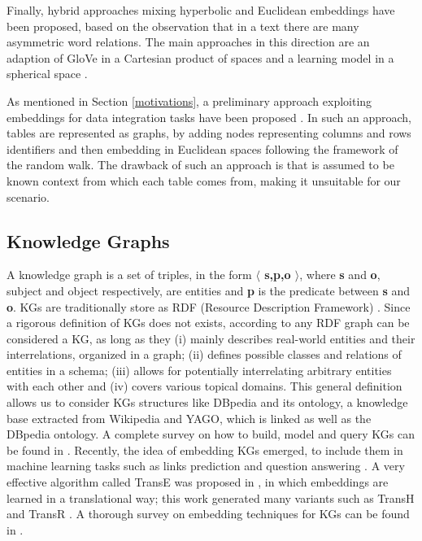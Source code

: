 Finally, hybrid approaches mixing hyperbolic and Euclidean embeddings have been proposed, based on the observation that in a text there are many asymmetric word relations. The main approaches in this direction are an adaption of GloVe in a Cartesian product of spaces \cite{tifrea2018poincare} and a learning model in a spherical space \cite{meng2019spherical}.  

As mentioned in Section \ref{motivations}, a preliminary approach exploiting embeddings for data integration tasks have been proposed \cite{cappuzzo2020creating}. In such an approach, tables are represented as graphs, by adding nodes representing columns and rows identifiers and then embedding in Euclidean spaces following the framework of the random walk. The drawback of such an approach is that is assumed to be known context from which each table comes from, making it unsuitable for our scenario.

\subsection{Knowledge Graphs}
A knowledge graph is a set of triples, in the form \textbf{$\langle$ s,p,o $\rangle$}, where \textbf{s} and \textbf{o}, subject and object respectively, are entities and \textbf{p} is the predicate between \textbf{s} and \textbf{o}. KGs are traditionally store as RDF (Resource Description Framework) \cite{colazzo2014rdf}. Since a rigorous definition of KGs does not exists, according to \cite{paulheim2017knowledge} any RDF graph can be considered a KG, as long as they (i) mainly describes real-world entities and their interrelations, organized in a graph; (ii) defines possible classes and relations of entities in a schema; (iii) allows for potentially interrelating arbitrary entities with each other and (iv) covers various topical domains. This general definition allows us to consider KGs structures like DBpedia \cite{lehmann2015dbpedia} and its ontology, a knowledge base extracted from Wikipedia and YAGO, \cite{suchanek2007yago} which is linked as well as the DBpedia ontology. A complete survey on how to build, model and query KGs can be found in \cite{ji2020survey}.
Recently, the idea of embedding KGs emerged, to include them in machine learning tasks such as links prediction \cite{rossi2020knowledge} and question answering \cite{huang2019knowledge}. A very effective algorithm called TransE was proposed in \cite{bordes2013translating}, in which embeddings are learned in a translational way; this work generated many variants such as TransH \cite{wang2014knowledge} and TransR \cite{lin2015learning}. A thorough survey on embedding techniques for KGs can be found in \cite{goyal2018graph}.



